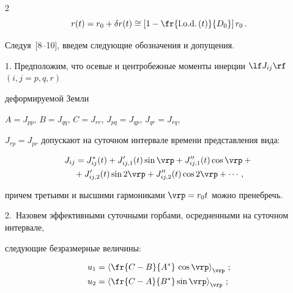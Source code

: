 \begin{multicols}{2}
\begin{equation}
    r(t)=r_0 +\delta r(t)\cong \left[1-\fr{\mathrm{l.o.d.}\,(t)}{ D_{0}}\right]r_{0}\,.


    \label{e2-mar}


    \end{equation}





Следуя~[8--10], введем следующие обозначения и допущения.





\medskip





1. Предположим, что осевые и центробежные моменты инерции $\lf J_{ij}\rf$ $(i,j=p,q,r)$ 


де\-фор\-ми\-ру\-емой Земли


$A=J_{pp}$, $B=J_{qq}$, $C=J_{rr}$, $J_{pq}=J_{qp}$, $J_{qr}=J_{rq}$, 


$J_{rp}=J_{pr}$ допускают на суточном интервале времени представления вида:


\columnbreak





\noindent


\begin{multline*}


J_{ij} =J_{ij}^* (t) +J_{ij,1}' (t)\sin \vrp + J_{ij,1}'' (t) \cos \vrp +{}\\


{}+J_{ij,2}' (t) \sin 2\vrp + J_{ij,2}'' (t) \cos 2\vrp+\cdots\,,




\end{multline*}


причем третьими и высшими гармониками  $\vrp = r_0t$ можно пренебречь.





\smallskip


2.\ Назовем эффективными суточными горбами, осредненными на суточном интервале, 


следующие безразмерные величины:


\begin{align*}


u_1 &=\left\langle\fr{C-B}{A^*}\, \cos \vrp\right\rangle_\vrp\,;\\


     u_2 &=\left\langle\fr{C-A}{B^*} \sin  \vrp\right\rangle_\vrp\,;\\



\end{align*}
\end{multicols}
